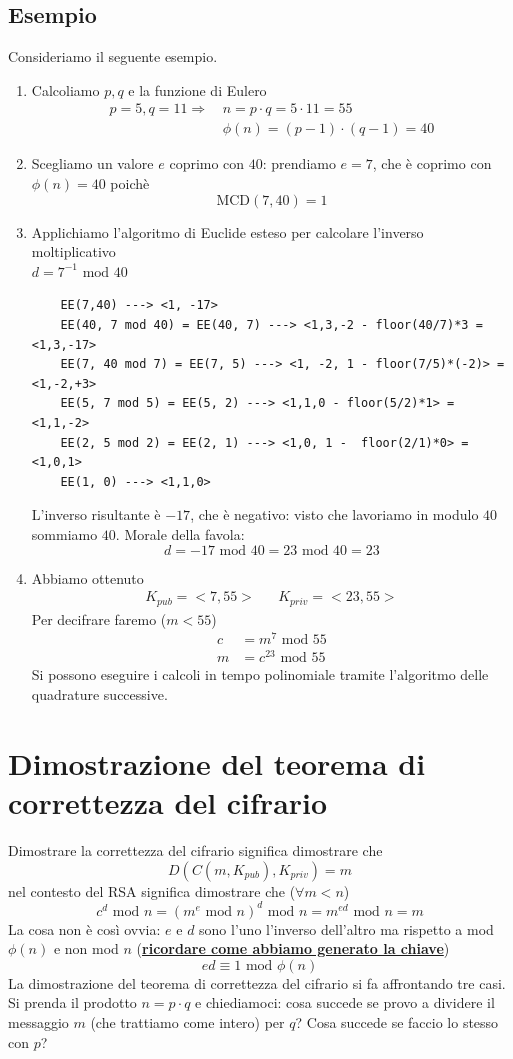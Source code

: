 \subsection{Esempio}
Consideriamo il seguente esempio.
\begin{enumerate}
	\item Calcoliamo $p,q$ e la funzione di Eulero
	\begin{align*}
		p=5, q= 11 \Longrightarrow \,&n = p \cdot q = 5 \cdot 11 = 55\\
		&\phi(n)=(p-1)\cdot(q-1)=40
	\end{align*}
	\item Scegliamo un valore $e$ coprimo con $40$: prendiamo $e=7$, che è coprimo con $\phi(n)=40$ poichè
	$$\text{MCD}(7,40)=1$$
	\item Applichiamo l'algoritmo di Euclide esteso per calcolare l'inverso moltiplicativo\\$d=7^{-1}\text{ mod }40$
	\begin{verbatim}
	EE(7,40) ---> <1, -17>
	EE(40, 7 mod 40) = EE(40, 7) ---> <1,3,-2 - floor(40/7)*3 = <1,3,-17>
	EE(7, 40 mod 7) = EE(7, 5) ---> <1, -2, 1 - floor(7/5)*(-2)> = <1,-2,+3>
	EE(5, 7 mod 5) = EE(5, 2) ---> <1,1,0 - floor(5/2)*1> = <1,1,-2>
	EE(2, 5 mod 2) = EE(2, 1) ---> <1,0, 1 -  floor(2/1)*0> = <1,0,1>
	EE(1, 0) ---> <1,1,0>
	\end{verbatim}
	L'inverso risultante è $-17$, che è negativo: visto che lavoriamo in modulo $40$ sommiamo $40$. Morale della favola:
	$$d=-17 \text{ mod } 40 = 23 \text{ mod } 40=23$$
	\item Abbiamo ottenuto 
	\begin{align*}
		K_{pub}=<7,55>&&K_{priv}=<23, 55>
	\end{align*}
	Per decifrare faremo ($m< 55$)
	\begin{align*}
		c&=m^7 \text{ mod }55\\m&=c^{23} \text{ mod } 55
	\end{align*}
	Si possono eseguire i calcoli in tempo polinomiale tramite l'algoritmo delle quadrature successive.
\end{enumerate}


\section{Dimostrazione del teorema di correttezza del cifrario}
Dimostrare la correttezza del cifrario significa dimostrare che
$$ D(C(m, K_{pub}), K_{priv}) = m $$
nel contesto del RSA significa dimostrare che ($\forall  m < n$)
$$c^d\text{ mod }n=(m^e \text{ mod } n)^d \text{ mod } n = \boxed{m^{ed} \text{ mod } n = m}$$
La cosa non è così ovvia: $e$ e $d$ sono l'uno l'inverso dell'altro ma rispetto a mod $\phi(n)$ e non mod $n$ (\textbf{\underline{ricordare come abbiamo generato la chiave}})
$$ed \equiv 1 \text{ mod } \phi(n)$$
La dimostrazione del teorema di correttezza del cifrario si fa affrontando tre casi. Si prenda il prodotto $n=p\cdot q$ e chiediamoci: cosa succede se provo a dividere il messaggio $m$ (che trattiamo come intero) per $q$? Cosa succede se faccio lo stesso con $p$?

